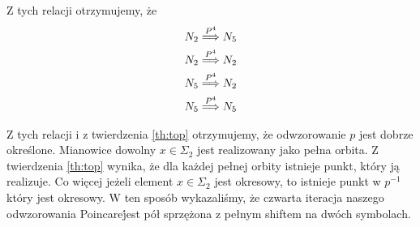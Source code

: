   Z tych relacji otrzymujemy, że 
\begin{eqnarray*}
  N_2 \stackrel{ P^4 }{\Longrightarrow} N_5 \\
  N_2 \stackrel{ P^4 }{\Longrightarrow} N_2 \\
  N_5 \stackrel{ P^4 }{\Longrightarrow} N_2 \\
  N_5 \stackrel{ P^4 }{\Longrightarrow} N_5 
\end{eqnarray*}

Z tych relacji i z twierdzenia \ref{th:top} otrzymujemy, że odwzorowanie $ p $ jest dobrze określone. Mianowice dowolny $ x \in \Sigma_2 $ 
jest realizowany jako pełna orbita. Z twierdzenia \ref{th:top} wynika, że dla każdej pełnej orbity istnieje punkt, który ją realizuje. Co więcej
jeżeli element $ x \in \Sigma_2 $ jest okresowy, to istnieje punkt w $ p^{-1} $ który jest okresowy. 
W ten sposób wykazaliśmy, że czwarta iteracja naszego odwzorowania Poincare\' jest pół sprzężona z pełnym shiftem na dwóch symbolach.














